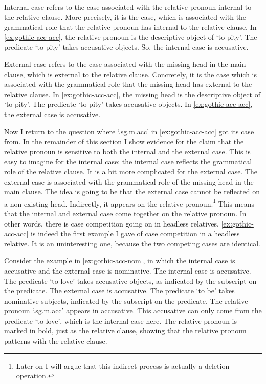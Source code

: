 Internal case refers to the case associated with the relative pronoun internal to the relative clause. More precisely, it is the case, which is associated with the grammatical role that the relative pronoun has internal to the relative clause. In \ref{ex:gothic-acc-acc}, the relative pronoun is the descriptive object of  `to pity'. The predicate  `to pity' takes accusative objects. So, the internal case is accusative.

External case refers to the case associated with the missing head in the main clause, which is external to the relative clause. Concretely, it is the case which is associated with the grammatical role that the missing head has external to the relative clause. In \ref{ex:gothic-acc-acc}, the missing head is the descriptive object of  `to pity'. The predicate  `to pity' takes accusative objects. In \ref{ex:gothic-acc-acc}, the external case is accusative.

Now I return to the question where  `.\ac{sg}.\ac{m}.\ac{acc}' in \ref{ex:gothic-acc-acc} got its case from. In the remainder of this section I show evidence for the claim that the relative pronoun is sensitive to both the internal and the external case.
This is easy to imagine for the internal case: the internal case reflects the grammatical role of the relative clause. It is a bit more complicated for the external case. The external case is associated with the grammatical role of the missing head in the main clause. The idea is going to be that the external case cannot be reflected on a non-existing head. Indirectly, it appears on the relative pronoun.\footnote{
Later on I will argue that this indirect process is actually a deletion operation.
}
This means that the internal and external case come together on the relative pronoun. In other words, there is case competition going on in headless relatives. \ref{ex:gothic-acc-acc} is indeed the first example I gave of case competition in a headless relative. It is an uninteresting one, because the two competing cases are identical.

Consider the example in \ref{ex:gothic-acc-nom}, in which the internal case is accusative and the external case is nominative.
The internal case is accusative. The predicate  `to love' takes accusative objects, as indicated by the subscript on the predicate.
The external case is accusative. The predicate  `to be' takes nominative subjects, indicated by the subscript on the predicate.
The relative pronoun  `.\ac{sg}.\ac{m}.\ac{acc}' appears in accusative. This accusative can only come from the predicate  `to love', which is the internal case here. The relative pronoun is marked in bold, just as the relative clause, showing that the relative pronoun patterns with the relative clause.

